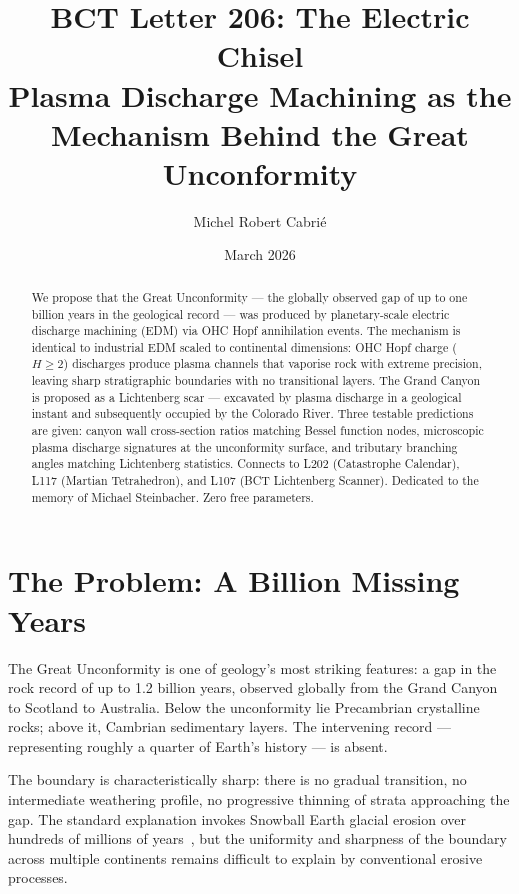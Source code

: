 \documentclass[aps,prl,twocolumn,superscriptaddress]{revtex4-2}
\begin{document}
\title{BCT Letter 206: The Electric Chisel\\
Plasma Discharge Machining as the Mechanism Behind the Great Unconformity}
\author{Michel Robert Cabri\'e}
\date{March 2026}

\begin{abstract}
We propose that the Great Unconformity --- the globally observed gap of up to one billion years in the geological record --- was produced by planetary-scale electric discharge machining (EDM) via OHC Hopf annihilation events. The mechanism is identical to industrial EDM scaled to continental dimensions: OHC Hopf charge ($H \geq 2$) discharges produce plasma channels that vaporise rock with extreme precision, leaving sharp stratigraphic boundaries with no transitional layers. The Grand Canyon is proposed as a Lichtenberg scar --- excavated by plasma discharge in a geological instant and subsequently occupied by the Colorado River. Three testable predictions are given: canyon wall cross-section ratios matching Bessel function nodes, microscopic plasma discharge signatures at the unconformity surface, and tributary branching angles matching Lichtenberg statistics. Connects to L202 (Catastrophe Calendar), L117 (Martian Tetrahedron), and L107 (BCT Lichtenberg Scanner). Dedicated to the memory of Michael Steinbacher. Zero free parameters.
\end{abstract}

\maketitle

\section{The Problem: A Billion Missing Years}

The Great Unconformity is one of geology's most striking features: a gap in the rock record of up to 1.2 billion years, observed globally from the Grand Canyon to Scotland to Australia. Below the unconformity lie Precambrian crystalline rocks; above it, Cambrian sedimentary layers. The intervening record --- representing roughly a quarter of Earth's history --- is absent.

The boundary is characteristically sharp: there is no gradual transition, no intermediate weathering profile, no progressive thinning of strata approaching the gap. The standard explanation invokes Snowball Earth glacial erosion over hundreds of millions of years~\cite{Keller2019}, but the uniformity and sharpness of the boundary across multiple continents remains difficult to explain by conventional erosive processes.
\end{document}
